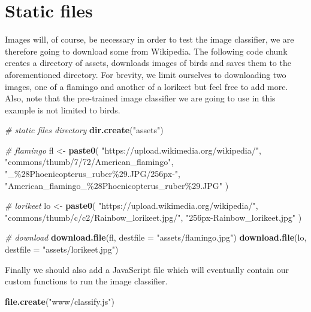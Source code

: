 \documentclass[
  10pt,
]{krantz}
\makeatletter
\newenvironment{Shaded}{\begin{snugshade}}{\end{snugshade}}
\newcommand{\CommentTok}[1]{\textcolor[rgb]{0.37,0.37,0.37}{\textit{#1}}}
\newcommand{\DataTypeTok}[1]{\textcolor[rgb]{0.27,0.27,0.27}{#1}}
\newcommand{\KeywordTok}[1]{\textcolor[rgb]{0.27,0.27,0.27}{\textbf{#1}}}
\newcommand{\NormalTok}[1]{#1}
\newcommand{\StringTok}[1]{\textcolor[rgb]{0.5,0.5,0.5}{#1}}
\newenvironment{kframe}{%
\medskip{}
\setlength{\fboxsep}{.8em}
 \def\at@end@of@kframe{}%
 \ifinner\ifhmode%
  \def\at@end@of@kframe{\end{minipage}}%
  \begin{minipage}{\columnwidth}%
 \fi\fi%
 \def\FrameCommand##1{\hskip\@totalleftmargin \hskip-\fboxsep
 \colorbox{shadecolor}{##1}\hskip-\fboxsep
     \hskip-\linewidth \hskip-\@totalleftmargin \hskip\columnwidth}%
 \MakeFramed {\advance\hsize-\width
   \@totalleftmargin\z@ \linewidth\hsize
   \@setminipage}}%
 {\par\unskip\endMakeFramed%
 \at@end@of@kframe}
\renewenvironment{Shaded}{\begin{kframe}}{\end{kframe}}
\makeatother
\begin{document}
\hypertarget{shiny-complete-images}{%
\section{Static files}\label{shiny-complete-images}}

Images will, of course, be necessary in order to test the image classifier, we are therefore going to download some from Wikipedia. The following code chunk creates a directory of assets, downloads images of birds and saves them to the aforementioned directory. For brevity, we limit ourselves to downloading two images, one of a flamingo and another of a lorikeet but feel free to add more. Also, note that the pre-trained image classifier we are going to use in this example is not limited to birds.

\begin{Shaded}
\begin{Highlighting}[]
\CommentTok{\# static files directory}
\KeywordTok{dir.create}\NormalTok{(}\StringTok{"assets"}\NormalTok{)}

\CommentTok{\# flamingo}
\NormalTok{fl <{-}}\StringTok{ }\KeywordTok{paste0}\NormalTok{(}
  \StringTok{"https://upload.wikimedia.org/wikipedia/"}\NormalTok{,}
  \StringTok{"commons/thumb/7/72/American\_flamingo"}\NormalTok{,}
  \StringTok{"\_\%28Phoenicopterus\_ruber\%29.JPG/256px{-}"}\NormalTok{,}
  \StringTok{"American\_flamingo\_\%28Phoenicopterus\_ruber\%29.JPG"}
\NormalTok{)}

\CommentTok{\# lorikeet}
\NormalTok{lo <{-}}\StringTok{ }\KeywordTok{paste0}\NormalTok{(}
  \StringTok{"https://upload.wikimedia.org/wikipedia/"}\NormalTok{,}
  \StringTok{"commons/thumb/c/c2/Rainbow\_lorikeet.jpg/"}\NormalTok{,}
  \StringTok{"256px{-}Rainbow\_lorikeet.jpg"}
\NormalTok{)}

\CommentTok{\# download}
\KeywordTok{download.file}\NormalTok{(fl, }\DataTypeTok{destfile =} \StringTok{"assets/flamingo.jpg"}\NormalTok{)}
\KeywordTok{download.file}\NormalTok{(lo, }\DataTypeTok{destfile =} \StringTok{"assets/lorikeet.jpg"}\NormalTok{)}
\end{Highlighting}
\end{Shaded}

Finally we should also add a JavaScript file which will eventually contain our custom functions to run the image classifier.

\begin{Shaded}
\begin{Highlighting}[]
\KeywordTok{file.create}\NormalTok{(}\StringTok{"www/classify.js"}\NormalTok{)}
\end{Highlighting}
\end{Shaded}
\end{document}

